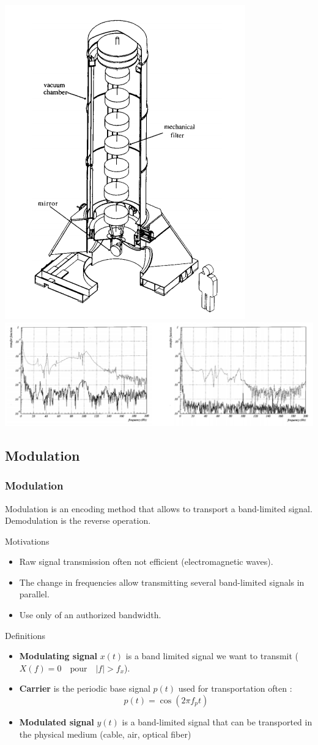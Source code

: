 \begin{center}
  \includegraphics[width=.2\linewidth]{imgs/fourier/virgo_mechanical_filter.png}
  \includegraphics[width=.75\linewidth]{imgs/fourier/virgo_mechanical_filter_response.png}
\end{center}


\subsection{Modulation}
\label{sec:modulation}

\frametitle{Modulation}
  

  Modulation is an encoding method that allows to transport a band-limited signal.
  Demodulation is the reverse operation.
\begin{exampleblock}{Motivations}
  \begin{itemize}
  \item Raw signal transmission often not efficient
    (electromagnetic waves).
  \item The change in frequencies allow transmitting several band-limited signals in parallel.
  \item Use only of an authorized bandwidth.
  \end{itemize}
\end{exampleblock}

\begin{block}{Definitions}
\begin{itemize}
  \item \textbf{Modulating signal} $x(t)$ is a band limited signal we want to transmit ($ X(f)=0\quad \text{pour}\quad |f|>f_x$).
  \item \textbf{Carrier} is the periodic base signal $p(t)$ used for transportation often : $$ p(t)= \cos(2\pi f_p t)$$
  \item \textbf{Modulated signal} $y(t)$ is a band-limited signal that can be transported in the physical medium (cable, air, optical fiber)
\end{itemize}
\end{block}


